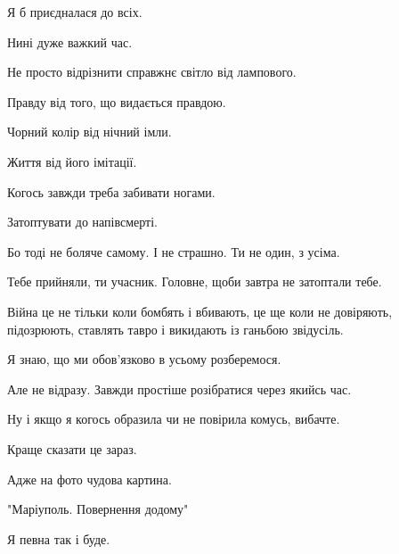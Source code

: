 Я б приєдналася до всіх.\par
Нині дуже важкий час.\par
Не просто відрізнити справжнє світло від лампового.\par
Правду від того, що видається правдою.\par
Чорний колір від нічний імли.\par
Життя від його імітації.\par
Когось завжди треба забивати ногами.\par
Затоптувати до напівсмерті.\par
Бо тоді не боляче самому. І не страшно. Ти не один, з усіма.\par
Тебе прийняли, ти учасник. Головне, щоби завтра не затоптали тебе.\par
Війна це не тільки коли бомбять і вбивають, це ще коли не довіряють, підозрюють, ставлять тавро і викидають із ганьбою звідусіль.\par
Я знаю, що ми обов'язково в усьому розберемося.\par
Але не відразу. Завжди простіше розібратися через якийсь час.\par
Ну і якщо я когось образила чи не повірила комусь, вибачте.\par
Краще сказати це зараз.\par
Адже на фото чудова картина.\par
"Маріуполь. Повернення додому"\par
Я певна так і буде.\par
